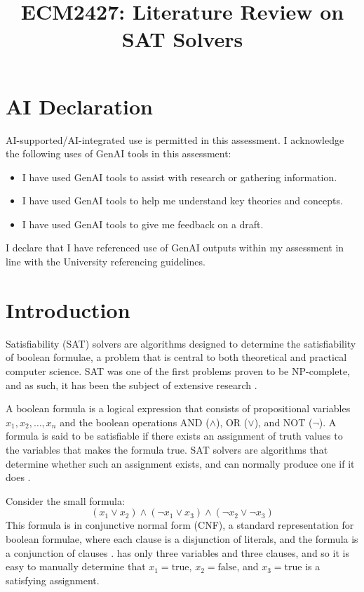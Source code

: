 \documentclass[conference]{IEEEtran}
\begin{document}
\title{ECM2427: Literature Review on SAT Solvers}
\author{}

\onecolumn

\section*{AI Declaration}
AI-supported/AI-integrated use is permitted in this assessment. I acknowledge the following uses of GenAI tools in this assessment:
\begin{itemize}
    \item I have used GenAI tools to assist with research or gathering information.
    \item I have used GenAI tools to help me understand key theories and concepts.
    \item I have used GenAI tools to give me feedback on a draft.
\end{itemize}
I declare that I have referenced use of GenAI outputs within my assessment in line with the University referencing guidelines.

\newpage
\twocolumn

\maketitle

\section{Introduction}
Satisfiability (SAT) solvers are algorithms designed to determine the satisfiability of boolean formulae, a problem that is central to both theoretical and practical computer science. SAT was one of the first problems proven to be NP-complete, and as such, it has been the subject of extensive research \cite{gong2017survey}\cite{cook2023complexity}.

A boolean formula is a logical expression that consists of propositional variables \(x_1, x_2, \ldots, x_n\) and the boolean operations AND (\(\land\)), OR (\(\lor\)), and NOT (\(\neg\)). A formula is said to be satisfiable if there exists an assignment of truth values to the variables that makes the formula true. SAT solvers are algorithms that determine whether such an assignment exists, and can normally produce one if it does \cite{gong2017survey}.

Consider the small formula:
\begin{equation}
    (x_1 \lor x_2) \land (\neg x_1 \lor x_3) \land (\neg x_2 \lor \neg x_3)
    \label{eq:small_example}
\end{equation}
This formula is in conjunctive normal form (CNF), a standard representation for boolean formulae, where each clause is a disjunction of literals, and the formula is a conjunction of clauses \cite{gelder2011generalized}.  has only three variables and three clauses, and so it is easy to manually determine that \(x_1 = \text{true}\), \(x_2 = \text{false}\), and \(x_3 = \text{true}\) is a satisfying assignment.
\end{document}
